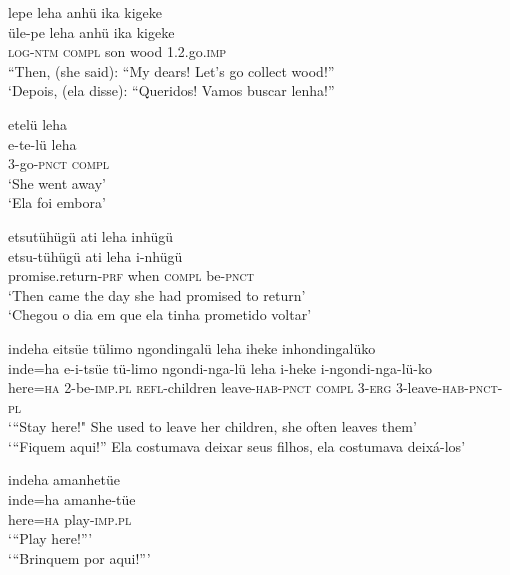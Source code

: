 \documentclass[output=paper,
modfonts,nonflat
]{langsci/langscibook}
\begin{document}
\ea lepe leha anhü ika kigeke \\[.3em]
\gll üle-pe		leha	anhü	ika	kigeke \\
\textsc{log-ntm}	\textsc{compl}	son 	wood 	1.2.go.\textsc{imp} \\
\glt “Then, (she said): “My dears! Let’s go collect wood!” \\
‘Depois, (ela disse): “Queridos! Vamos buscar lenha!” \\
\z

\ea etelü leha{\footnotemark}{} \\[.3em]
\gll e-te-lü		leha \\
3-go-\textsc{pnct} 	\textsc{compl} \\
\glt‘She went away’ \\
‘Ela foi embora’ \\
\z

\newpage 
\ea etsutühügü ati leha inhügü \\[.3em]
\gll etsu-tühügü		ati	leha	i-nhügü \\
promise.return-\textsc{prf} 	when	\textsc{compl}	be-\textsc{pnct} \\
\glt ‘Then came the day she had promised to return’ \\
‘Chegou o dia em que ela tinha prometido voltar’ \\
\z

\ea indeha eitsüe tülimo ngondingalü leha iheke inhondingalüko \\[.3em]
\gll inde=ha	e-i-tsüe	tü-limo	ngondi-nga-lü		leha	i-heke  i-ngondi-nga-lü-ko \\
here=\textsc{ha}	2-be-\textsc{imp.pl} 	\textsc{refl}-children 	leave-\textsc{hab-pnct}	\textsc{compl}	3-\textsc{erg} 3-leave-\textsc{hab-pnct-pl} \\
\glt ‘“Stay here!" She used to leave her children, she often leaves them’ \\
‘“Fiquem aqui!” Ela costumava deixar seus filhos, ela costumava deixá-los' \\
\z

\ea indeha amanhetüe \\[.3em]
\gll inde=ha	amanhe-tüe \\
here=\textsc{ha} 	play-\textsc{imp.pl} \\
\glt ‘“Play here!”’ \\
‘“Brinquem por aqui!”’ \\
\z
\end{document}
